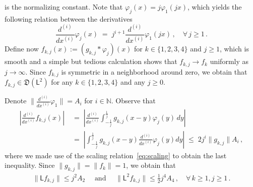 \documentclass[12pt,a4paper]{article}
\theoremstyle{plain}
\theoremstyle{remark}
\newcommand{\msf}[1]{{\mathsf #1}}
\newcommand{\mf}[1]{{\mathfrak #1}}
\newcommand{\bb}[1]{{\mathbb #1}}
\newcommand{\norm}[1]{\lVert#1\rVert}
\begin{document}
	is the normalizing constant. Note that $\varphi_j(x) = j\varphi_1(jx)$, which yields the following relation between the derivatives
	\begin{equation}\label{eq:scaling}
		\frac{d^{(i)}}{dx^{(i)}}\varphi_j(x) \;=\; j^{i+1}\frac{d^{(i)}}{dx^{(i)}}\varphi_1(jx)\,,\quad\forall\, {j\geq 1}\,.
	\end{equation}
	Define now $f_{k,j}(x) := (g_{k,j}\ast\varphi_j)(x)$ for $k \in \{1,2,3,4\}$ and  ${j\geq 1}$,
	which is smooth and a simple but tedious calculation shows that $f_{k,j} \to f_k$ uniformly as $j \to \infty$. Since $f_{k,j}$ is symmetric in a neighborhood around zero, we obtain that $f_{k,j} \in \mf{D}(\msf{L}^2)$ for any $k \in \{1,2,3,4\}$ and any $j\geq 0$.
	
	Denote $\norm{\frac{d^{(i)}}{dx^{(i)}}\varphi_1} = A_i$ for $i\in \bb N$. Observe that
	\begin{align*}
		\left| \frac{d^{(i)}}{dx^{(i)}}f_{k,j}(x)\right| &\;=\; \left|\frac{d^{(i)}}{dx^{(i)}}\int_{-\frac{1}{j}}^{\frac{1}{j}} g_{k,j}(x - y)\varphi_j(y)\,dy\right| \\
		&\;=\; \left|\int_{-\frac{1}{j}}^{\frac{1}{j}} g_{k,j}(x-y)\frac{d^{(i)}}{dx^{(i)}}\varphi_j(y)dy \right|\;\leq\;  2j^i\norm{g_{k,j}}A_i\,,
	\end{align*}
	where we made use of the scaling relation~\eqref{eq:scaling} to obtain the last inequality.
	Since $\norm{g_{k,j}} = \norm{f_k}=1$, we obtain that
	\begin{align*}
		\norm{\msf{L}f_{k,j}} \leq j^2A_2 \quad \text{ and }\quad
		\norm{\msf{L}^2f_{k,j}} \leq \frac12 j^4A_4\,,\quad\forall \,k\geq 1, {j\geq 1}\,.
	\end{align*}
	
\end{document}
